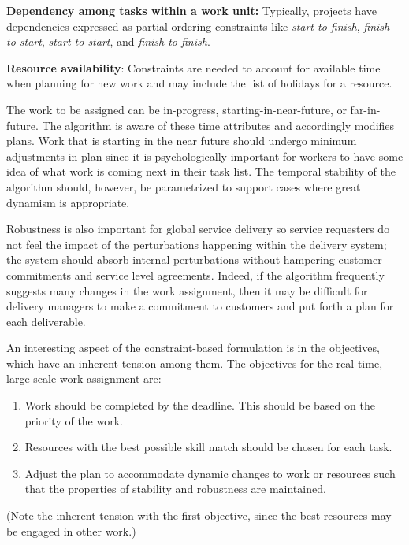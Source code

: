 \documentclass[10pt,journal,cspaper,compsoc]{IEEEtran}
\begin{document}
{\bf Dependency among tasks within a work unit:} Typically, projects have dependencies expressed as partial ordering constraints like 
\emph{start-to-finish}, \emph{finish-to-start}, \emph{start-to-start}, and \emph{finish-to-finish}. 

{\bf Resource availability}: Constraints are needed to account for available time when planning for new work and may include the list of holidays 
for a resource.

The work to be assigned can be in-progress, starting-in-near-future, or far-in-future. The algorithm is aware of these time 
attributes and accordingly modifies plans. Work that is starting in the near future should undergo minimum adjustments in plan
since it is psychologically important for workers to have some idea of what work is coming next in their task list.
The temporal stability of the algorithm should, however, be parametrized to support cases where great dynamism is appropriate.

Robustness is also important for global service delivery so service requesters do not feel the impact of the perturbations happening within 
the delivery system; the system should absorb internal perturbations without hampering customer commitments and service level agreements. 
Indeed, if the algorithm frequently suggests many changes in the work assignment, then it may be difficult for delivery managers to 
make a commitment to customers and put forth a plan for each deliverable. 

An interesting aspect of the constraint-based formulation is in the objectives, which have an inherent tension among them. 
The objectives for the real-time, large-scale work assignment are:
\begin{enumerate}
  \item Work should be completed by the deadline. This should be based on the priority of the work.
  \item Resources with the best possible skill match should be chosen for each task. 
  \item Adjust the plan to accommodate dynamic changes to work or resources such that the properties of stability and robustness are maintained.
\end{enumerate}
(Note the inherent tension with the first objective, since the best resources may be engaged in other work.) 
\end{document}

